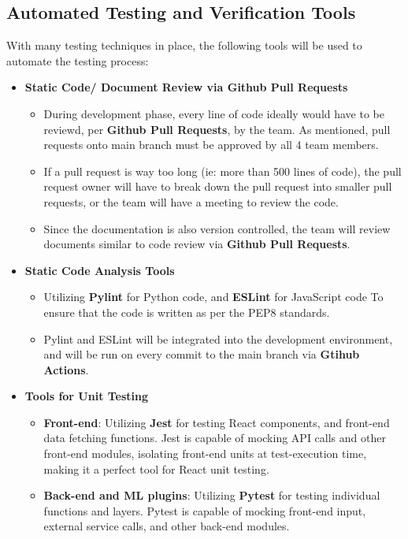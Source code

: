 \documentclass[12pt, titlepage]{article}
\begin{document}
\subsection{Automated Testing and Verification Tools}
With many testing techniques in place, the following tools will be used to automate the testing process:
\begin{itemize}
  \item{\textbf{Static Code/ Document Review via Github Pull Requests}}
  \begin{itemize}
    \item{During development phase, every line of code ideally would have to be reviewd, per \textbf{Github Pull Requests}, by the team. As mentioned, pull requests onto main branch must be approved by all 4 team members.}
    \item{If a pull request is way too long (ie: more than 500 lines of code), the pull request owner will have to break down the pull request into smaller pull requests, or the team will have a meeting to review the code.}
    \item{Since the documentation is also version controlled, the team will review documents similar to code review via \textbf{Github Pull Requests}.}
  \end{itemize}

  \item{\textbf{Static Code Analysis Tools}}
  \begin{itemize}
    \item{Utilizing \textbf{Pylint} for Python code, and \textbf{ESLint} for JavaScript code To ensure that the code is written as per the PEP8 standards.}
    \item{Pylint and ESLint will be integrated into the development environment, and will be run on every commit to the main branch via \textbf{Gtihub Actions}.}
  \end{itemize}

  \item{\textbf{Tools for Unit Testing}}
  \begin{itemize}
    \item{\textbf{Front-end}: Utilizing \textbf{Jest} for testing React components, and front-end data fetching functions. Jest is capable of mocking API calls and other front-end modules, isolating front-end units at test-execution time, making it a perfect tool for React unit testing.}
    \item{\textbf{Back-end and ML plugins}: Utilizing \textbf{Pytest} for testing individual functions and layers. Pytest is capable of mocking front-end input, external service calls, and other back-end modules.}
  \end{itemize}


\end{itemize}
\end{document}
